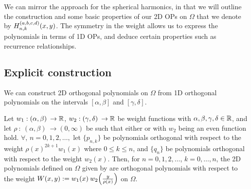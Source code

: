 We can mirror the approach for the spherical harmonics, in that we will outline the construction and some basic properties of our 2D OPs on $\Omega$ that we denote by $H_{n,k}^{(a,b,c,d)}(x,y)$. The symmetry in the weight allows us to express the polynomials in terms of 1D OPs, and deduce certain properties such as recurrence relationships. 

\subsection{Explicit construction}

We can construct 2D orthogonal polynomials on $\Omega$ from 1D orthogonal polynomials on the intervals \([\alpha,\beta]\) and \([\gamma,\delta]\). 

\begin{proposition}\label{prop:ds:construction}
	Let $w_1 : (\alpha,\beta) \: \to \mathbb{R}$, $w_2 : (\gamma,\delta) \: \to \mathbb{R}$ be weight functions with $\alpha,\beta,\gamma,\delta \in \mathbb{R}$, and let $\rho \: : \: (\alpha,\beta) \: \to (0,\infty)$ be such that either  or  with $w_2$ being an even function hold.
$\forall$, $n = 0,1,2,\dots, $ let $\{p_{n,k}\}$ be polynomials orthogonal with respect to the weight $\rho(x)^{2k+1} w_1(x)$ where $0 \le k \le n$, and $\{q_{n}\}$ be polynomials orthogonal with respect to the weight $w_2(x)$. Then, for $n = 0,1,2,\dots$, $k = 0,\dots,n$, the 2D polynomials defined on $\Omega$ given by
are orthogonal polynomials with respect to the weight $W(x,y) := w_1(x) \: w_2\fpr(\frac{y}{\rho(x)})$ on $\Omega$. 
\end{proposition}



